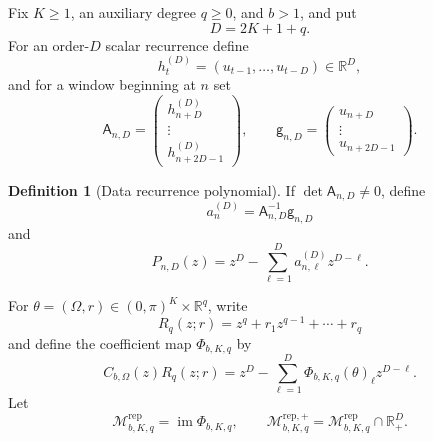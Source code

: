 \documentclass[11pt]{amsart}
\numberwithin{equation}{section}
\theoremstyle{plain}
\theoremstyle{definition}
\newtheorem{definition}[theorem]{Definition}
\theoremstyle{remark}
\begin{document}
Fix $K\geq1$, an auxiliary degree $q\geq0$, and $b>1$, and put
\begin{equation}
D=2K+1+q.
\label{eq:repaired_dimension}
\end{equation}
For an order-$D$ scalar recurrence define
\begin{equation}
h_t^{(D)}=(u_{t-1},\ldots,u_{t-D})\in\mathbb R^D,
\label{eq:repaired_recurrence_row}
\end{equation}
and for a window beginning at $n$ set
\begin{equation}
\mathsf A_{n,D}=\begin{pmatrix}h_{n+D}^{(D)}\\ \vdots\\ h_{n+2D-1}^{(D)}\end{pmatrix},\qquad
\mathsf g_{n,D}=\begin{pmatrix}u_{n+D}\\ \vdots\\ u_{n+2D-1}\end{pmatrix}.
\label{eq:repaired_data_matrix}
\end{equation}

\begin{definition}[Data recurrence polynomial]
\label{def:data_recurrence_polynomial}
If $\det\mathsf A_{n,D}\neq0$, define
\begin{equation}
a_n^{(D)}=\mathsf A_{n,D}^{-1}\mathsf g_{n,D}
\label{eq:data_recurrence_coefficients}
\end{equation}
and
\begin{equation}
P_{n,D}(z)=z^D-\sum_{\ell=1}^{D}a_{n,\ell}^{(D)}z^{D-\ell}.
\label{eq:data_recurrence_polynomial}
\end{equation}
\end{definition}

For $\theta=(\Omega,r)\in(0,\pi)^K\times\mathbb R^q$, write
\begin{equation}
R_q(z;r)=z^q+r_1z^{q-1}+\cdots+r_q
\label{eq:dynamic_auxiliary_multiplier}
\end{equation}
and define the coefficient map $\Phi_{b,K,q}$ by
\begin{equation}
C_{b,\Omega}(z)R_q(z;r)=z^D-\sum_{\ell=1}^{D}\Phi_{b,K,q}(\theta)_\ell z^{D-\ell}.
\label{eq:repaired_coefficient_map}
\end{equation}
Let
\begin{equation}
\mathcal M^{\mathrm{rep}}_{b,K,q}=\operatorname{im}\Phi_{b,K,q},\qquad
\mathcal M^{\mathrm{rep},+}_{b,K,q}=\mathcal M^{\mathrm{rep}}_{b,K,q}\cap\mathbb R_+^D.
\label{eq:repaired_manifold_definition}
\end{equation}
\end{document}
